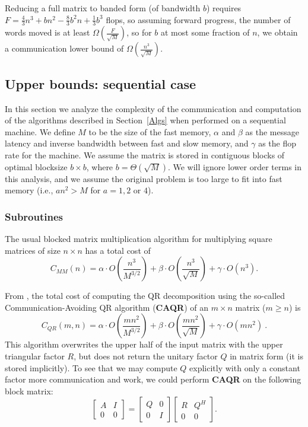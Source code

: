 \documentclass{article}
\def\lt{\left}
\def\rt{\right}
\theoremstyle{definition}
\begin{document}
Reducing a full matrix to banded form (of bandwidth $b$) requires 
$F=\frac43 n^3 + bn^2 -\frac83 b^2n + \frac13 b^3$ flops, 
so assuming forward progress, the number of words moved is at least 
$\Omega\lt(\frac{F}{\sqrt M}\rt)$, so for $b$ at most some fraction 
of $n$, we obtain a communication lower bound of $\Omega\lt(\frac{n^3}{\sqrt M}\rt)$. 

\subsection{Upper bounds: sequential case} 
\label{USeq}

In this section we analyze the complexity of the communication and computation of the algorithms described in Section~\ref{Algs} when performed on a sequential machine.  We define $M$ to be the size of the fast memory, $\alpha$ and $\beta$ as the message latency and inverse bandwidth between fast and slow memory, and $\gamma$ as the flop rate for the machine.  We assume the matrix is stored in contiguous blocks of optimal blocksize $b\times b$, where $b=\Theta(\sqrt M)$.  We will ignore lower order terms in this analysis, and we assume the original problem is too large to fit into fast memory (i.e., $an^2 > M$ for $a=1,2$ or $4$).
\subsubsection{Subroutines}
\label{USeqSub}

The usual blocked matrix multiplication algorithm for multiplying square matrices of size $n\times n$ has a total cost of $$C_{MM}(n) = \alpha \cdot O\lt(\frac{n^3}{M^{3/2}}\rt) + \beta \cdot O\lt( \frac{n^3}{\sqrt M}\rt) + \gamma \cdot O \lt( n^3\right).$$

From \cite{DGHL08}, the total cost of computing the QR decomposition using the so-called Communication-Avoiding QR algorithm (\textbf{CAQR}) of an $m\times n$ matrix ($m\geq n$) is $$C_{QR}(m,n) = \alpha \cdot O \lt( \frac{mn^2}{M^{3/2}}\rt) + \beta \cdot O\lt( \frac{mn^2}{\sqrt M}\rt) + \gamma \cdot O \lt(mn^2\rt)~.$$ This algorithm overwrites the upper half of the input matrix with the upper triangular factor $R$, but does not return the unitary factor $Q$ in matrix form (it is stored implicitly).  To see that we may compute $Q$ explicitly with only a constant factor more communication and work, we could perform \textbf{CAQR} on the following block matrix:
$$\left[\begin{matrix} A & I \\ 0 & 0 \end{matrix}\right] = \left[\begin{matrix} Q & 0 \\ 0 & I \end{matrix}\right] \left[\begin{matrix} R & Q^H \\ 0 & 0 \end{matrix}\right].$$
\end{document}
